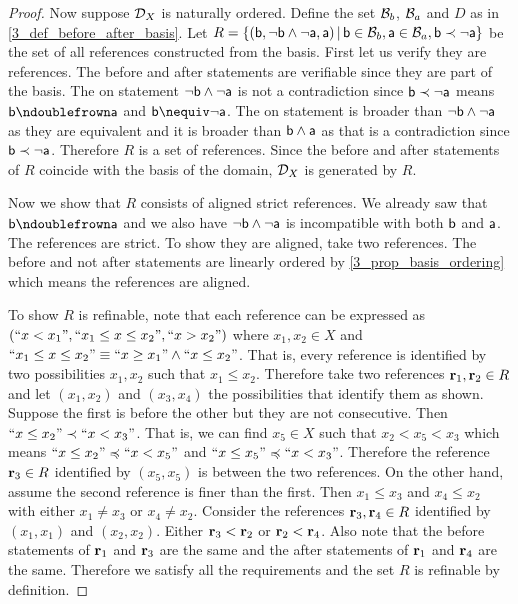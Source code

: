 \documentclass[11pt,letterpaper,fleqn]{memoir} %
\begin{document}
\begin{mathSection}
\begin{proof}
	Now suppose $\edomain_X$ is naturally ordered. Define the set $\basis_b$, $\basis_a$ and $D$ as in \ref{3_def_before_after_basis}. Let $R = \{ (\stmt[b], \NOT \stmt[b] \AND \NOT \stmt[a], \stmt[a]) \, | \, \stmt[b] \in \basis_b, \stmt[a] \in \basis_a, \stmt[b] \snarrower \NOT \stmt[a] \}$ be the set of all references constructed from the basis. First let us verify they are references. The before and after statements are verifiable since they are part of the basis. The on statement $\NOT \stmt[b] \AND \NOT \stmt[a]$ is not a contradiction since $\stmt[b] \snarrower \NOT \stmt[a]$ means $\stmt[b] \ncomp \stmt[a]$ and $\stmt[b] \nequiv \NOT \stmt[a]$. The on statement is broader than $\NOT \stmt[b] \AND \NOT \stmt[a]$ as they are equivalent and it is broader than $\stmt[b] \AND \stmt[a]$ as that is a contradiction since $\stmt[b] \snarrower \NOT \stmt[a]$. Therefore $R$ is a set of references. Since the before and after statements of $R$ coincide with the basis of the domain, $\edomain_X$ is generated by $R$.
	
	Now we show that $R$ consists of aligned strict references. We already saw that $\stmt[b] \ncomp \stmt[a]$ and we also have $\NOT \stmt[b] \AND \NOT \stmt[a]$ is incompatible with both $\stmt[b]$ and $\stmt[a]$. The references are strict. To show they are aligned, take two references. The before and not after statements are linearly ordered by \ref{3_prop_basis_ordering} which means the references are aligned.
	
	To show $R$ is refinable, note that each reference can be expressed as $(``x < x_1", ``x_1 \leq x \leq x_2", ``x > x_2")$ where $x_1, x_2 \in X$ and $``x_1 \leq x \leq x_2" \equiv ``x \geq x_1" \AND ``x \leq x_2"$. That is, every reference is identified by two possibilities $x_1, x_2$ such that $x_1 \leq x_2$. Therefore take two references $\refStmt_1, \refStmt_2 \in R$ and let $(x_1, x_2)$ and $(x_3, x_4)$ the possibilities that identify them as shown. Suppose the first is before the other but they are not consecutive. Then $``x \leq x_2" \snarrower ``x < x_3"$. That is, we can find $x_5 \in X$ such that  $x_2 < x_5 < x_3$ which means $``x \leq x_2" \narrower ``x < x_5"$ and $``x \leq x_5" \narrower ``x < x_3"$. Therefore the reference $\refStmt_3 \in R$ identified by $(x_5, x_5)$ is between the two references. On the other hand, assume the second reference is finer than the first. Then $x_1 \leq x_3$ and $x_4 \leq x_2$ with either $x_1 \neq x_3$ or $x_4 \neq x_2$. Consider the references $\refStmt_3, \refStmt_4 \in R$ identified by $(x_1, x_1)$ and $(x_2, x_2)$. Either $\refStmt_3 < \refStmt_2$ or $\refStmt_2 < \refStmt_4$. Also note that the before statements of $\refStmt_1$ and $\refStmt_3$ are the same and the after statements of $\refStmt_1$ and $\refStmt_4$ are the same. Therefore we satisfy all the requirements and the set $R$ is refinable by definition.
\end{proof}
\end{mathSection}
\end{document}
